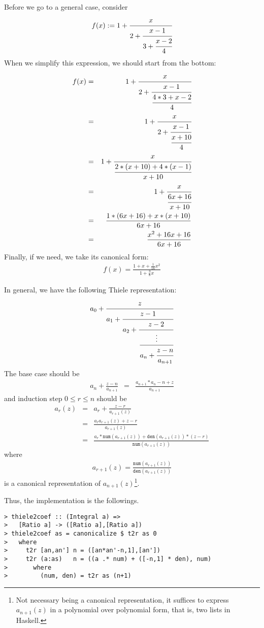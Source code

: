 \documentclass[11pt]{book}
\begin{document}
Before we go to a general case, consider
\begin{eqnarray}
f(x) := 1 + \cfrac{x}{2+\cfrac{x-1}{3+\cfrac{x-2}{4}}} 
\end{eqnarray}
When we simplify this expression, we should start from the bottom:
\begin{eqnarray}
f(x) &=& 1 + \cfrac{x}{2+\cfrac{x-1}{\cfrac{4*3+x-2}{4}}} \\
&=& 1 + \cfrac{x}{2+\cfrac{x-1}{\cfrac{x+10}{4}}} \\
&=& 1 + \cfrac{x}{\cfrac{2*(x+10) +4*(x-1)}{x+10}} \\
&=& 1 + \cfrac{x}{\cfrac{6x+16}{x+10}} \\
&=& \frac{1*(6x+16) + x*(x+10)}{6x+16} \\
&=& \frac{x^2+16x+16}{6x+16}
\end{eqnarray}
Finally, if we need, we take its canonical form:
\begin{eqnarray}
f(x) = \frac{1+ x+ \frac{1}{16}x^2}{1+ \frac{3}{8} x}
\end{eqnarray}

In general, we have the following Thiele representation:
\begin{eqnarray}
a_0 + \cfrac{z}{a_1 + \cfrac{z-1}{a_2 + \cfrac{z- 2}{ \cfrac{\vdots}{a_{n} + \cfrac{z-n}{a_{n+1}}}}}}
\end{eqnarray}
The base case should be
\begin{eqnarray}
a_{n}+ \frac{z-n}{a_{n+1}} &=& \frac{a_{n+1}* a_{n}-n + z }{a_{n+1}} 
\end{eqnarray}
and induction step $0 \leq r \leq n$ should be
\begin{eqnarray}
a_{r}(z)
&=&a_{r}+ \frac{z-r}{a_{r+1}(z)} \\
&=& \frac{a_{r}a_{r+1}(z)+ z -r}{a_{r+1}(z)} \\
&=& \frac{a_{r}*\texttt{num}\left(a_{r+1}(z) \right)+ \texttt{den}\left(a_{r+1}(z) \right) * \left(z -r\right)}{\texttt{num}\left(a_{r+1}(z) \right)} 
\end{eqnarray}
where
\begin{eqnarray}
a_{r+1}(z) = \frac{\texttt{num}\left(a_{r+1}(z) \right)}{\texttt{den}\left(a_{r+1}(z) \right)}
\end{eqnarray}
is a canonical representation of $a_{n+1}(z)$\footnote{
Not necessary being a canonical representation, it suffices to express $a_{n+1}(z)$ in a polynomial over polynomial form, that is, two lists in Haskell.
}.

Thus, the implementation is the followings.
\begin{verbatim}
> thiele2coef :: (Integral a) => 
>   [Ratio a] -> ([Ratio a],[Ratio a])
> thiele2coef as = canonicalize $ t2r as 0
>   where
>     t2r [an,an'] n = ([an*an'-n,1],[an'])
>     t2r (a:as)   n = ((a .* num) + ([-n,1] * den), num)
>       where
>         (num, den) = t2r as (n+1)\end{verbatim}
\end{document}
